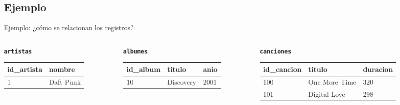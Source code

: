 \documentclass[aspectratio=169, 10pt]{beamer}
\begin{document}
\subsection{Ejemplo}
\begin{frame}[t]{Ejemplo: ¿cómo se relacionan los registros?}
    \centering
    \footnotesize
    \setlength{\tabcolsep}{4pt}
    \renewcommand{\arraystretch}{1.0}

    \begin{columns}[T]
        \begin{column}{0.22\textwidth}
            \centering
            \textbf{\texttt{artistas}}\par\vspace{0.1cm}
            \begin{tabular}{ll}
                \toprule
                \textbf{id\_artista} & \textbf{nombre} \\
                \midrule
                1 & Daft Punk \\
                \bottomrule
            \end{tabular}
        \end{column}

        \begin{column}{0.36\textwidth}
            \centering
            \textbf{\texttt{albumes}}\par\vspace{0.1cm}
            \begin{tabular}{lll}
                \toprule
                \textbf{id\_album} & \textbf{titulo} & \textbf{anio} \\
                \midrule
                10 & Discovery & 2001 \\
                \bottomrule
            \end{tabular}
        \end{column}

        \begin{column}{0.40\textwidth}
            \centering
            \textbf{\texttt{canciones}}\par\vspace{0.1cm}
            \begin{tabular}{lll}
                \toprule
                \textbf{id\_cancion} & \textbf{titulo} & \textbf{duracion} \\
                \midrule
                100 & One More Time & 320 \\
                101 & Digital Love  & 298 \\
                \bottomrule
            \end{tabular}
        \end{column}
    \end{columns}


\end{frame}
\end{document}
